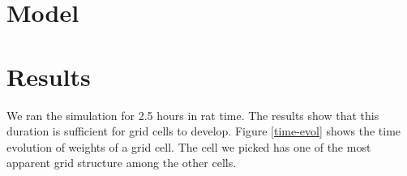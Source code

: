 \documentclass[a4paper, 12pt]{article}
\begin{document}
\section{Model}
%


%
%
%
\section{Results}
We ran the simulation for 2.5 hours in rat time. The results show that this duration is sufficient for grid cells to develop. Figure \ref{time-evol} shows the time evolution of weights of a grid cell. The cell we picked has one of the most apparent grid structure among the other cells.

\end{document}
